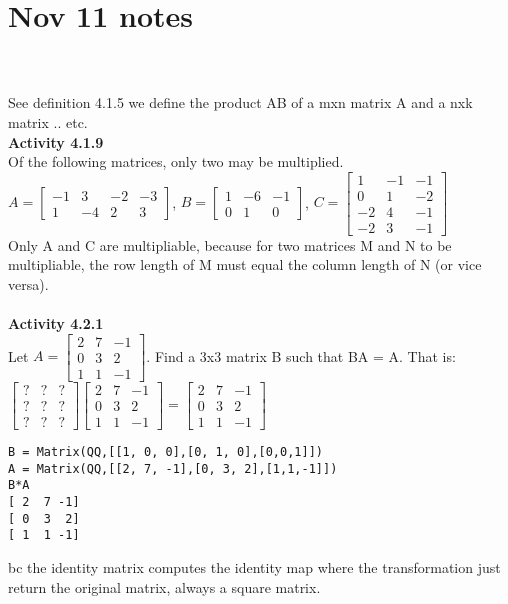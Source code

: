 \documentclass{article}
\begin{document}
\section*{Nov 11 notes}\\
\\
See definition 4.1.5 we define the product AB of a mxn matrix A and a nxk matrix .. etc.
\\
\textbf{Activity 4.1.9}\\
Of the following matrices, only two may be multiplied. \\
$A = \begin{bmatrix} -1 & 3 & -2 & -3 \\ 1 & -4 & 2 & 3 \end{bmatrix}$, $B = \begin{bmatrix} 1 & -6 & -1  \\ 0 & 1 & 0  \end{bmatrix}$,  $C = \begin{bmatrix} 1 & -1 & -1  \\ 0 & 1 & -2 \\ -2 & 4 & -1 \\ -2 & 3 & -1  \end{bmatrix}$\\
Only A and C are multipliable, because for two matrices M and N to be multipliable, the row length of M must equal the column length of N (or vice versa).\\
\\
\textbf{Activity 4.2.1}\\
Let 
$A = \begin{bmatrix} 2 & 7 & -1  \\ 0 & 3 & 2 \\ 1 & 1 & -1 \end{bmatrix}$. Find a 3x3 matrix B such that BA = A. That is:\\
$\begin{bmatrix} ? & ? & ? \\ ? & ? & ?\\ ? & ? & ? \end{bmatrix}  \begin{bmatrix} 2 & 7 & -1  \\ 0 & 3 & 2 \\ 1 & 1 & -1 \end{bmatrix} = \begin{bmatrix} 2 & 7 & -1  \\ 0 & 3 & 2 \\ 1 & 1 & -1 \end{bmatrix}$\\
\begin{verbatim}
B = Matrix(QQ,[[1, 0, 0],[0, 1, 0],[0,0,1]])
A = Matrix(QQ,[[2, 7, -1],[0, 3, 2],[1,1,-1]])
B*A
[ 2  7 -1]
[ 0  3  2]
[ 1  1 -1]
\end{verbatim}
bc the identity matrix computes the identity map where the transformation just return the original matrix, always a square matrix.\\
\end{document}

